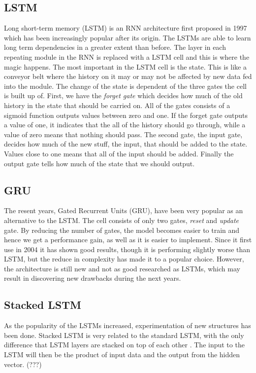 \documentclass{article} %
\begin{document}
\subsection{LSTM}
Long short-term memory (LSTM) is an RNN architecture first proposed in 1997 \cite{LSTM} which has been increasingly popular after its origin. The LSTMs are able to learn long term dependencies in a greater extent than before. The layer in each repeating module in the RNN is replaced with a LSTM cell and this is where the magic happens. The most important in the LSTM cell is the state. This is like a conveyor belt where the history on it may or may not be affected by new data fed into the module. The change of the state is dependent of the three gates the cell is built up of. First, we have the \textit{forget gate} which decides how much of the old history in the state that should be carried on. All of the gates consists of a sigmoid function outputs values between zero and one. If the forget gate outputs a value of one, it indicates that the all of the history should go through, while a value of zero means that nothing should pass. The second gate, the input gate, decides how much of the new stuff, the input, that should be added to the state. Values close to one means that all of the input should be added. Finally the output gate tells how much of the state that we should output.

\subsection{GRU}
The resent years, Gated Recurrent Units (GRU), have been very popular as an alternative to the LSTM. The cell consists of only two gates, \textit{reset} and \textit{update} gate. By reducing the number of gates, the model becomes easier to train and hence we get a performance gain, as well as it is easier to implement. Since it first use in 2004 \cite{Cho} it has shown good results, though it is performing slightly worse than LSTM, but the reduce in complexity has made it to a popular choice. However, the architecture is still new and not as good researched as LSTMs, which may result in discovering new drawbacks during the next years.

\subsection{Stacked LSTM}
As the popularity of the LSTMs increased, experimentation of new structures has been done. Stacked LSTM is very related to the standard LSTM, with the only difference that LSTM layers are stacked on top of each other \cite{gridLSTM}. The input to the LSTM will then be the product of input data and the output from the hidden vector. (???)
\end{document}
